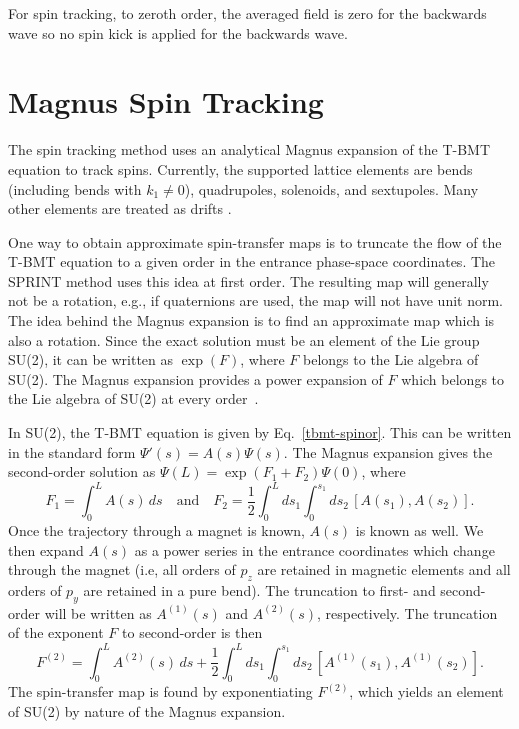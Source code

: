For spin tracking, to zeroth order, the averaged field is zero for the backwards wave so no spin
kick is applied for the backwards wave.

\section{Magnus Spin Tracking}
\label{s:magnus}

The  spin tracking method uses an analytical Magnus expansion of the T-BMT equation to
track spins.  Currently, the supported lattice elements are bends (including bends with $k_1 \neq
0$), quadrupoles, solenoids, and sextupoles.  Many other elements are treated as drifts
.

One way to obtain approximate spin-transfer maps is to truncate the flow of the T-BMT equation to a
given order in the entrance phase-space coordinates.  The SPRINT method  uses
this idea at first order. The resulting map will generally not be a rotation, e.g., if quaternions
are used, the map will not have unit norm. The idea behind the Magnus expansion is to find an
approximate map which is also a rotation. Since the exact solution must be an element of the Lie
group SU(2), it can be written as $\exp(F)$, where $F$ belongs to the Lie algebra of SU(2). The
Magnus expansion provides a power expansion of $F$ which belongs to the Lie algebra of SU(2) at
every order~\cite{b:magnus}.

In SU(2), the T-BMT equation is given by Eq.~\eqref{tbmt-spinor}. This can be written in the
standard form $\Psi'(s)=A(s)\Psi(s)$. The Magnus expansion gives the second-order solution as
$\Psi(L)=\exp(F_1+F_2)\Psi(0)$, where
\begin{equation}
F_1 = \int_0^LA(s)\,ds \quad \mathrm{and} \quad F_2=\frac{1}{2}\int_0^Lds_1\int_0^{s_1}ds_2\,[A(s_1),A(s_2)].
\end{equation}
Once the trajectory through a magnet is known, $A(s)$ is known as well. We then expand $A(s)$ as a
power series in the entrance coordinates which change through the magnet (i.e, all orders of $p_z$
are retained in magnetic elements and all orders of $p_y$ are retained in a pure bend). The
truncation to first- and second-order will be written as $A^{(1)}(s)$ and $A^{(2)}(s)$,
respectively. The truncation of the exponent $F$ to second-order is then
\begin{equation}
F^{(2)}=\int_0^LA^{(2)}(s)\,ds+\frac{1}{2}\int_0^Lds_1\int_0^{s_1}ds_2\,[A^{(1)}(s_1),A^{(1)}(s_2)].
\end{equation}
The spin-transfer map is found by exponentiating $F^{(2)}$, which yields an element of SU(2) by
nature of the Magnus expansion.


